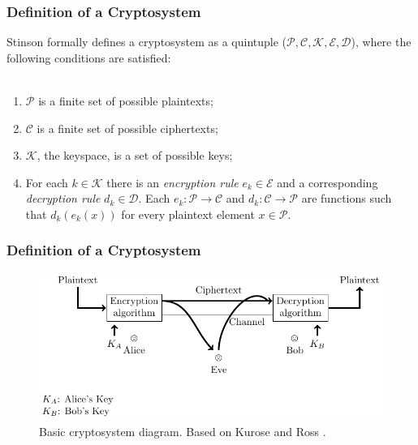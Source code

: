\documentclass{beamer}
\begin{document}
\begin{frame}
\frametitle{Definition of a Cryptosystem}

Stinson \cite{stinson2005cryptography} formally defines a cryptosystem as a quintuple ($\mathcal{P}, \mathcal{C}, \mathcal{K}, \mathcal{E}, \mathcal{D}$), where the following conditions are satisfied:  \\~\\
\begin{enumerate}
  \setlength\itemsep{1em}
\item $\mathcal{P}$ is a finite set of possible plaintexts;
\item $\mathcal{C}$ is a finite set of possible ciphertexts;
\item $\mathcal{K}$, the keyspace, is a set of possible keys;
\item For each $k \in \mathcal{K}$ there is an \textit{encryption rule} $ e_{k} \in \mathcal{E}$  and a corresponding \textit{decryption rule} $ d_{k} \in \mathcal{D}$. Each $e_{k}: \mathcal{P} \rightarrow \mathcal{C}$ and $d_{k}: \mathcal{C} \rightarrow \mathcal{P}$ are functions such that $d_{k}(e_{k}(x))$ for every plaintext element $x \in \mathcal{P}$.
\end{enumerate}

\end{frame}

\begin{frame}
\frametitle{Definition of a Cryptosystem}

\begin{figure}[H]
  \centering
  \includegraphics{../img/basiccryptosystem}
  \caption[Basic cryptosystem diagram]{Basic cryptosystem diagram. Based on Kurose and Ross \cite{kurose2010computer}.}
  \label{fig:cryptoflow}
\end{figure}


\end{frame}
\end{document}
